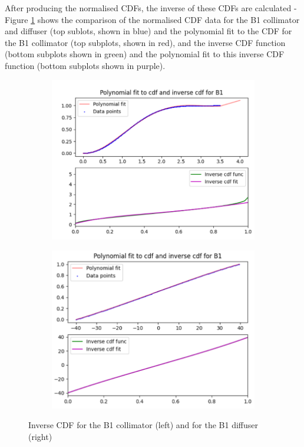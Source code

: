 After producing the normalised CDFs, the inverse of these CDFs are calculated - Figure \ref{fig:B1_PDF_CDF_inv_diff_coll} shows the comparison of the normalised CDF data for the B1 collimator and diffuser (top sublots, shown in blue) and the polynomial fit to the CDF for the B1 collimator (top subplots, shown in red), and the inverse CDF function (bottom subplots shown in green) and the polynomial fit to this inverse CDF function (bottom subplots shown in purple). 

\begin{figure}
    \centering
    \begin{subfigure}{0.5\textwidth}
        \centering
        \includegraphics[width=\textwidth]{Figures/B1_inv_coll_cdf.png} %
    \end{subfigure}\hfill
    \begin{subfigure}{0.5\textwidth}
        \centering
        \includegraphics[width=\textwidth]{Figures/B1_inv_diff_cdf.png} %
    \end{subfigure}
    \caption{Inverse CDF for the B1 collimator (left) and for the B1 diffuser (right)}
    \label{fig:B1_PDF_CDF_inv_diff_coll}
\end{figure}


